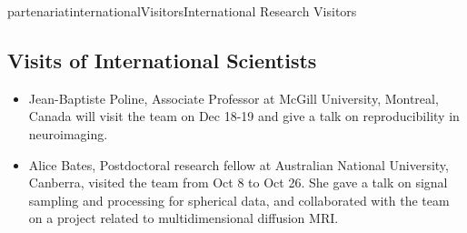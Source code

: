 \documentclass{ra2018}
\begin{document}
\begin{module}{partenariat}{internationalVisitors}{International Research Visitors}

\subsection{Visits of International Scientists}

\begin{itemize}
    \item Jean-Baptiste Poline, Associate Professor at McGill University, Montreal, Canada will visit the team on Dec 18-19 and give a talk on reproducibility in neuroimaging.
    \item Alice Bates, Postdoctoral research fellow at Australian National University, Canberra, visited the team from Oct 8 to Oct 26. She gave a talk on signal sampling and processing for spherical data, and collaborated with 
    the team on a project related to multidimensional diffusion MRI.
\end{itemize}






\end{module}
\end{document}
